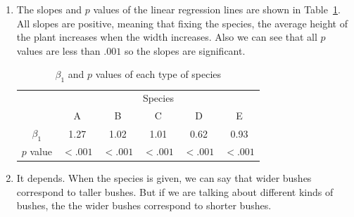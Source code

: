 \documentclass[12pt]{article}
\begin{document}
\begin{enumerate}
\item The slopes and $p$ values of the linear regression lines are shown in Table~\ref{Tab:2}. All slopes are positive, meaning that fixing the species, the average height of the plant increases when the width increases. Also we can see that all $p$ values are less than $.001$ so the slopes are significant.

\begin{table}[htpb]
	\centering
	\begin{tabular}{cccccc}
		\toprule
		\multirow{2}{*}{} &
		\multicolumn{5}{c}{Species}\\
		 & A & B & C & D & E \\
		\midrule
		$\beta_1$ &1.27&1.02&1.01&0.62&0.93\\
		\hline
		$p$ value & $<.001$ & $<.001$ & $<.001$ & $<.001$ & $<.001$ \\
		\bottomrule
	\end{tabular}
	\caption{$\beta_1$ and $p$ values of each type of species}
	\label{Tab:2}
\end{table}

\item It depends. When the species is given, we can say that wider bushes correspond to taller bushes. But if we are talking about different kinds of bushes, the the wider bushes correspond to shorter bushes.

\end{enumerate}
	
\end{document}
